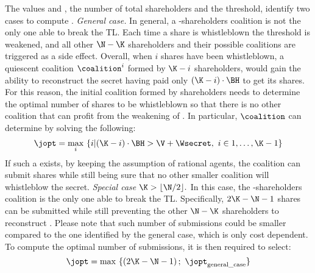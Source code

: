 The values \N and \K, the number of total shareholders and the threshold, identify two cases to compute  \jopt. \newline \vspace*{-0.5em} \newline
{\em General case.}
In general, a \K-shareholders coalition \coalition is not the only one able to break the TL. 
Each time a share is whistleblown the threshold \K is weakened, and all other $\N-\K$ shareholders and their possible coalitions are triggered as a side effect.
%
Overall, when $i$ shares have been whistleblown, a quiescent coalition $\coalition^i$ formed by $\K-i$ shareholders, would gain the ability to reconstruct the secret \secret having paid only $(\K-i) \cdot \BH$ to get its shares. 
For this reason, the initial coalition \coalition formed by \K shareholders needs to determine the optimal number of shares \jopt to be whistleblown so that there is no other coalition that can profit from the weakening of \K. In particular, $\coalition$ can determine \jopt by solving the following:	
$$\jopt = \operatorname*{max}_i\ \{i | (\K-i) \cdot \BH > \V + \Wsecret,\ i \in 1,\ldots,\K-1 \}$$
If such a \jopt exists, by keeping the assumption of rational agents, the coalition \coalition can submit \jopt shares while still being sure that no other smaller coalition will whistleblow the secret.	\newline \vspace*{-0.5em} \newline
{\em Special case $\K > \lfloor \N/2 \rfloor. $}
In this case, the \K-shareholders coalition \coalition is the only one able to break the TL. 
Specifically, $2\K-\N-1$ shares can be submitted while still preventing the other $\N-\K$ shareholders to reconstruct \secret. 
Please note that such number of submissions could be smaller compared to the one identified by the general case, which is only cost dependent. 
To compute the optimal number of submissions, it is then required to select:
$$ \jopt = \operatorname*{max}\ \{ \left( 2\K - \N - 1 \right) ; \text{ } \jopt _\text{general\textunderscore case} \}$$


